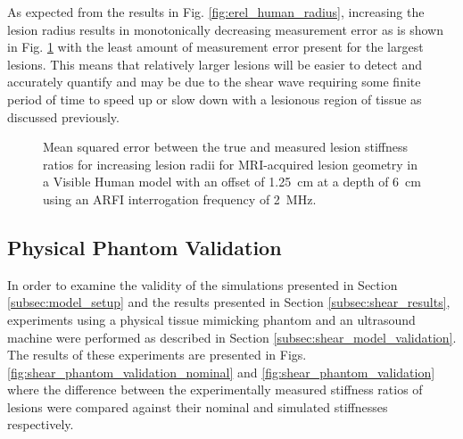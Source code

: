 			As expected from the results in Fig. \ref{fig:erel_human_radius}, increasing the lesion radius results in monotonically decreasing measurement error as is shown in Fig. \ref{fig:erel_human_radius_mse} with the least amount of measurement error present for the largest lesions. This means that relatively larger lesions will be easier to detect and accurately quantify and may be due to the shear wave requiring some finite period of time to speed up or slow down with a lesionous region of tissue as discussed previously.

			\begin{figure}[!htb]
				\centering
				\caption[Shear-wave speed quantified mean squared error related to MRI-acquired lesion size in a Visible Human model]{Mean squared error between the true and measured lesion stiffness ratios for increasing lesion radii for MRI-acquired lesion geometry in a Visible Human model with an offset of \SI{1.25}{\cm} at a depth of \SI{6}{\cm} using an ARFI interrogation frequency of \SI{2}{\MHz}.}
				\label{fig:erel_human_radius_mse}
			\end{figure}

		\FloatBarrier
		\subsection{Physical Phantom Validation}
			In order to examine the validity of the simulations presented in Section \ref{subsec:model_setup} and the results presented in Section \ref{subsec:shear_results}, experiments using a physical tissue mimicking phantom and an ultrasound machine were performed as described in Section \ref{subsec:shear_model_validation}. The results of these experiments are presented in Figs. \ref{fig:shear_phantom_validation_nominal} and \ref{fig:shear_phantom_validation} where the difference between the experimentally measured stiffness ratios of lesions were compared against their nominal and simulated stiffnesses respectively.

